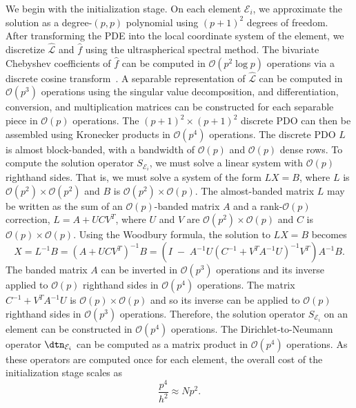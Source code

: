 We begin with the initialization stage. On each element $\mathcal{E}_i$, we approximate the solution as a degree-$(p,p)$ polynomial using $(p+1)^2$ degrees of freedom. After transforming the PDE into the local coordinate system of the element, we discretize $\widehat{\mathcal{L}}$ and $\widehat{f}$ using the ultraspherical spectral method. The bivariate Chebyshev coefficients of $\widehat{f}$ can be computed in $\mathcal{O}(p^2 \log p)$ operations via a discrete cosine transform~\cite{ATAP}. A separable representation of $\widehat{\mathcal{L}}$ can be computed in $\mathcal{O}(p^3)$ operations using the singular value decomposition, and differentiation, conversion, and multiplication matrices can be constructed for each separable piece in $\mathcal{O}(p)$ operations. The $(p+1)^2 \times (p+1)^2$ discrete PDO can then be assembled using Kronecker products in $\mathcal{O}(p^4)$ operations. The discrete PDO $L$ is almost block-banded, with a bandwidth of $\mathcal{O}(p)$ and $\mathcal{O}(p)$ dense rows. To compute the solution operator $S_{\mathcal{E}_i}$, we must solve a linear system with $\mathcal{O}(p)$ righthand sides. That is, we must solve a system of the form $LX=B$, where $L$ is $\mathcal{O}(p^2) \times \mathcal{O}(p^2)$ and $B$ is $\mathcal{O}(p^2) \times \mathcal{O}(p)$. The almost-banded matrix $L$ may be written as the sum of an $\mathcal{O}(p)$-banded matrix $A$ and a rank-$\mathcal{O}(p)$ correction, $L = A + UCV^T$, where $U$ and $V$ are $\mathcal{O}(p^2) \times \mathcal{O}(p)$ and $C$ is $\mathcal{O}(p) \times \mathcal{O}(p)$. Using the Woodbury formula, the solution to $LX=B$ becomes
\[
X = L^{-1} B = \left(A + UCV^T\right)^{-1} B = \left( I \;-\; A^{-1} U \left( C^{-1} + V^T A^{-1} U \right)^{-1} V^T \right) A^{-1} B.
\]
The banded matrix $A$ can be inverted in $\mathcal{O}(p^3)$ operations and its inverse applied to $\mathcal{O}(p)$ righthand sides in $\mathcal{O}(p^4)$ operations. The matrix $C^{-1} + V^T A^{-1} U$ is $\mathcal{O}(p) \times \mathcal{O}(p)$ and so its inverse can be applied to $\mathcal{O}(p)$ righthand sides in $\mathcal{O}(p^3)$ operations. Therefore, the solution operator $S_{\mathcal{E}_i}$ on an element can be constructed in $\mathcal{O}(p^4)$ operations. The Dirichlet-to-Neumann operator $\dtn_{\mathcal{E}_i}$ can be computed as a matrix product in $\mathcal{O}(p^4)$ operations. As these operators are computed once for each element, the overall cost of the initialization stage scales as
\[
\frac{p^4}{h^2} \approx N p^2.
\]

